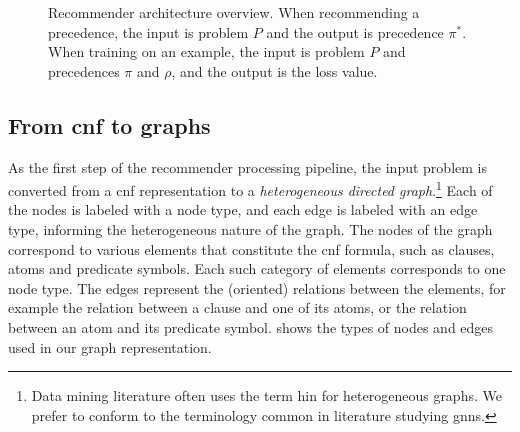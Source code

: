 \begin{figure}[h]
\caption{Recommender architecture overview.
When recommending a precedence, the input is problem $P$ and the output is precedence $\pi^*$.
When training on an example, the input is problem $P$ and precedences $\pi$ and $\rho$,
and the output is the loss value.}
\label{fig:architecture}
\centering
{}
\end{figure}

\subsection{From \gls{cnf} to graphs}

As the first step of the recommender processing pipeline,
the input problem is converted from a \gls{cnf} representation
to a \emph{heterogeneous directed graph}.\footnote{Data mining literature often uses the term \gls{hin} \cite{Shi2015} for heterogeneous graphs.
We prefer to conform to the terminology common in literature studying \glspl{gnn}.}
Each of the nodes is labeled with a node type,
and each edge is labeled with an edge type,
informing the heterogeneous nature of the graph.
The nodes of the graph correspond to various elements that constitute the \gls{cnf} formula,
such as clauses, atoms and predicate symbols.
Each such category of elements corresponds to one node type.
The edges represent the (oriented) relations between the elements,
for example the relation between a clause and one of its atoms,
or the relation between an atom and its predicate symbol.
 shows the types of nodes and edges used in our graph representation.

